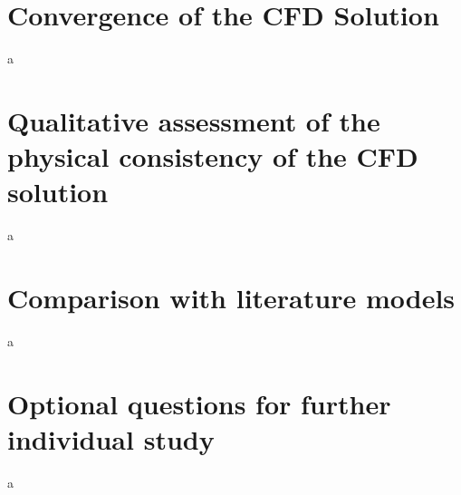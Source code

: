 \documentclass[12pt]{article}
\begin{document}
\section{Convergence of the CFD Solution} \label{sec:convergence}

        a

\section{Qualitative assessment of the physical consistency of the CFD solution} \label{sec:qualitative}

        a

\section{Comparison with literature models} \label{sec:literature}

        a

\section{Optional questions for further individual study} \label{sec:unstability}

        a



\end{document}
